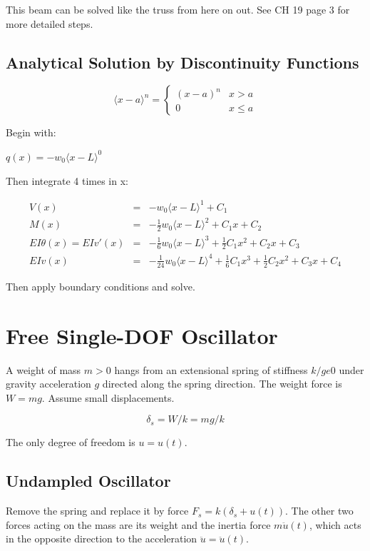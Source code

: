 \documentclass{article}
\begin{document}
\begin{multicols*}{2}
    This beam can be solved like the truss from here on out. See CH 19 page 3 
    for more detailed steps.

    \subsection*{Analytical Solution by Discontinuity Functions}
    \begin{equation*}
        \langle x-a \rangle ^n = \begin{cases} 
            (x-a)^n  & x>a\\
            0 &  x \le a
        \end{cases}
    \end{equation*}

    Begin with:\par 
    $q(x)=-w_0\langle x-L \rangle ^0$\par 
    Then integrate 4 times in x:\par 
    \begin{equation*}
        \begin{array}{llll}
            V(x) & = & -w_0\langle x-L \rangle ^1 + C_1\\
            M(x) & = & -\frac{1}{2}w_0\langle x-L\rangle ^2 + C_1x+C_2\\
            EI\theta (x) = EIv'(x) & = & -\frac{1}{6}w_0\langle x-L\rangle^3+\frac{1}{2}C_1x^2+C_2x+C_3\\
            EIv(x) & = & -\frac{1}{24}w_0\langle x-L\rangle^4 + \frac{1}{6}C_1x^3+\frac{1}{2}C_2x^2+C_3x+C_4
        \end{array}
    \end{equation*}

    Then apply boundary conditions and solve.

    \section*{Free Single-DOF Oscillator}
    A weight of mass $m > 0$ hangs from an extensional spring of stiffness $k /ge 0$
    under gravity acceleration $g$ directed along the spring direction. The weight
    force is $W = mg$. Assume small displacements.

    $$\delta_s=W/k=mg/k$$

    The only degree of freedom is $u = u(t)$.

    \subsection*{Undampled Oscillator}
    Remove the spring and replace it by force $F_s = k(\delta_s+u(t))$. The other
    two forces acting on the mass are its weight and the inertia force $m\ddot{u}(t)$,
    which acts in the opposite direction to the acceleration $\ddot{u}=\ddot{u}(t)$.


\end{multicols*}
\end{document}
